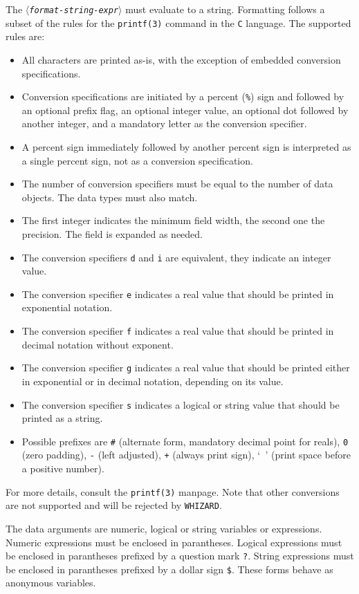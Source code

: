 \documentclass[12pt]{book}
\newcommand{\var}[1]{$\langle$\textit{#1}$\rangle$}
\newcommand{\ttt}[1]{\texttt{#1}}
\newcommand{\whizard}{\ttt{WHIZARD}}
\begin{document}
The \ttt{\var{format-string-expr}} must evaluate to a string.  Formatting
follows a subset of the rules for the \ttt{printf(3)} command in the \ttt{C}
language.  The supported rules are:
\begin{itemize}
\item All characters are printed as-is, with the exception of embedded
  conversion specifications.
\item Conversion specifications are initiated by a percent (\verb|%|) sign and
  followed by an optional prefix flag, an optional integer value, an optional
  dot followed by another integer, and a mandatory letter as the conversion
  specifier.
\item A percent sign immediately followed by another percent sign is
  interpreted as a single percent sign, not as a conversion specification.
\item The number of conversion specifiers must be equal to the number of data
  objects.  The data types must also match.
\item The first integer indicates the minimum field width, the second one the
  precision.  The field is expanded as needed.
\item The conversion specifiers \ttt{d} and \ttt{i} are equivalent, they
  indicate an integer value.
\item The conversion specifier \ttt{e} indicates a real value that should be
  printed in exponential notation.
\item The conversion specifier \ttt{f} indicates a real value that should be
  printed in decimal notation without exponent.
\item The conversion specifier \ttt{g} indicates a real value that should be
  printed either in exponential or in decimal notation, depending on its
  value.
\item The conversion specifier \ttt{s} indicates a logical or string value
  that should be printed as a string.
\item Possible prefixes are \verb|#| (alternate form, mandatory decimal point
  for reals), \verb|0| (zero padding), \verb|-| (left adjusted), \verb|+|
  (always print sign), `\verb| |' (print space before a positive number).
\end{itemize}
For more details, consult the \verb|printf(3)| manpage.  Note that other
conversions are not supported and will be rejected by \whizard.

The data arguments are numeric, logical or string variables or expressions.
Numeric expressions must be enclosed in parantheses.  Logical expressions must
be enclosed in parantheses prefixed by a question mark \verb|?|.  String
expressions must be enclosed in parantheses prefixed by a dollar sign
\verb|$|.  These forms behave as anonymous variables.
\end{document}
